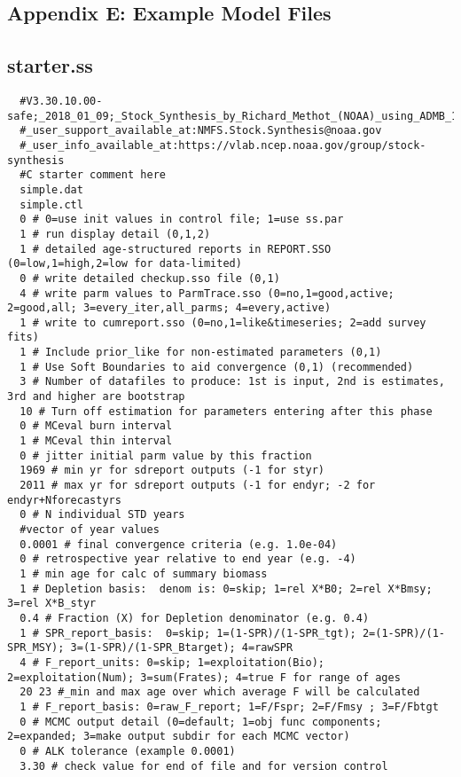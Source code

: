 \begin{landscape}

\section{Appendix E: Example Model Files}


\subsection{starter.ss}
\scriptsize{
\begin{verbatim}
  #V3.30.10.00-safe;_2018_01_09;_Stock_Synthesis_by_Richard_Methot_(NOAA)_using_ADMB_11.6
  #_user_support_available_at:NMFS.Stock.Synthesis@noaa.gov
  #_user_info_available_at:https://vlab.ncep.noaa.gov/group/stock-synthesis
  #C starter comment here
  simple.dat
  simple.ctl
  0 # 0=use init values in control file; 1=use ss.par
  1 # run display detail (0,1,2)
  1 # detailed age-structured reports in REPORT.SSO (0=low,1=high,2=low for data-limited) 
  0 # write detailed checkup.sso file (0,1) 
  4 # write parm values to ParmTrace.sso (0=no,1=good,active; 2=good,all; 3=every_iter,all_parms; 4=every,active)
  1 # write to cumreport.sso (0=no,1=like&timeseries; 2=add survey fits)
  1 # Include prior_like for non-estimated parameters (0,1) 
  1 # Use Soft Boundaries to aid convergence (0,1) (recommended)
  3 # Number of datafiles to produce: 1st is input, 2nd is estimates, 3rd and higher are bootstrap
  10 # Turn off estimation for parameters entering after this phase
  0 # MCeval burn interval
  1 # MCeval thin interval
  0 # jitter initial parm value by this fraction
  1969 # min yr for sdreport outputs (-1 for styr)
  2011 # max yr for sdreport outputs (-1 for endyr; -2 for endyr+Nforecastyrs
  0 # N individual STD years 
  #vector of year values 
  0.0001 # final convergence criteria (e.g. 1.0e-04) 
  0 # retrospective year relative to end year (e.g. -4)
  1 # min age for calc of summary biomass
  1 # Depletion basis:  denom is: 0=skip; 1=rel X*B0; 2=rel X*Bmsy; 3=rel X*B_styr
  0.4 # Fraction (X) for Depletion denominator (e.g. 0.4)
  1 # SPR_report_basis:  0=skip; 1=(1-SPR)/(1-SPR_tgt); 2=(1-SPR)/(1-SPR_MSY); 3=(1-SPR)/(1-SPR_Btarget); 4=rawSPR
  4 # F_report_units: 0=skip; 1=exploitation(Bio); 2=exploitation(Num); 3=sum(Frates); 4=true F for range of ages
  20 23 #_min and max age over which average F will be calculated
  1 # F_report_basis: 0=raw_F_report; 1=F/Fspr; 2=F/Fmsy ; 3=F/Fbtgt
  0 # MCMC output detail (0=default; 1=obj func components; 2=expanded; 3=make output subdir for each MCMC vector)
  0 # ALK tolerance (example 0.0001)
  3.30 # check value for end of file and for version control
\end{verbatim}
}



\end{landscape}
